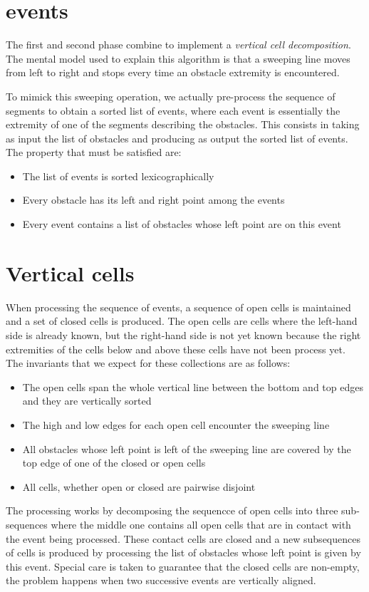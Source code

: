 \documentclass{easychair}
\begin{document}
\section{events}
The first and second phase combine to implement a {\em vertical cell decomposition}.
The mental model used to explain this algorithm is that a sweeping line moves from
left to right and stops every time an obstacle extremity is encountered.

To mimick this sweeping operation, we actually pre-process the sequence of segments
to obtain a sorted list of events, where each event is essentially the extremity
of one of the segments describing the obstacles.  This consists in taking as input
the list of obstacles and producing as output the sorted list of events.
The property that must be satisfied are:
\begin{itemize}
\item The list of events is sorted lexicographically
\item Every obstacle has its left and right point among the events
\item Every event contains a list of obstacles whose left point are on this event
\end{itemize}
\section{Vertical cells}
When processing the sequence of events, a sequence of open cells is maintained and a set
of closed cells is produced.  The open cells are cells where
the left-hand side is already known, but the right-hand side is not yet known because
the right extremities of the cells below and above these cells have not been process
yet.  The invariants that we expect for these collections are as follows:
\begin{itemize}
\item The open cells span the whole vertical line between the bottom and top edges
and they are vertically sorted
\item The high and low edges for each open cell encounter the sweeping line
\item All obstacles whose left point is left of the sweeping line are covered by the
top edge of one of the closed or open cells
\item All cells, whether open or closed are pairwise disjoint
\end{itemize}
The processing works by decomposing the sequencce of open cells into three sub-sequences
where the middle one contains all open cells that are in contact with the event being
processed.  These contact cells are closed and a new subsequences of cells is produced by
processing the list of obstacles whose left point is given by this event.  Special care
is taken to guarantee that the closed cells are non-empty, the problem happens when
two successive events are vertically aligned.
\end{document}
